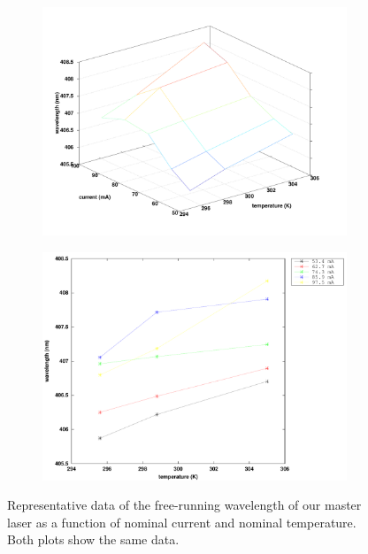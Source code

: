 \begin{figure}
\centering
\begin{subfigure}[b]{0.55\textwidth}
\includegraphics[width=1\textwidth]{TVlambda3} 
\label{currentandT:sfiga}
\end{subfigure}
\begin{subfigure}[b]{0.40\textwidth}
\includegraphics[width=1\textwidth]{TVlambda2}
\label{currentandT:sfigb}
\end{subfigure}
\caption[Wavelength vs temperature and current]{\label{3dCurrentandTgraph} Representative data of the free-running wavelength of our master laser as a function of nominal current and nominal temperature. Both plots show the same data.}
\end{figure}



